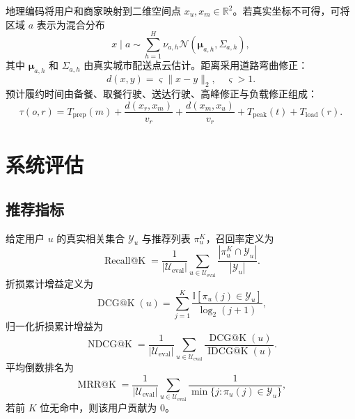 \documentclass[12pt,a4paper]{article}
\begin{document}
    地理编码将用户和商家映射到二维空间点 $x_u,x_m\in\mathbb{R}^2$。若真实坐标不可得，可将区域 $a$ 表示为混合分布
    \begin{equation}
        x\mid a\sim \sum_{h=1}^{H}\nu_{a,h}\mathcal{N}(\boldsymbol{\mu}_{a,h},\Sigma_{a,h}),
    \end{equation}
    其中 $\boldsymbol{\mu}_{a,h}$ 和 $\Sigma_{a,h}$ 由真实城市配送点云估计。距离采用道路弯曲修正：
    \begin{equation}
        d(x,y)=\varsigma\|x-y\|_2,\quad \varsigma>1.
    \end{equation}
    预计履约时间由备餐、取餐行驶、送达行驶、高峰修正与负载修正组成：
    \begin{equation}
        \tau(o,r)=T_{\mathrm{prep}}(m)+\frac{d(x_r,x_m)}{v_r}+\frac{d(x_m,x_u)}{v_r}+T_{\mathrm{peak}}(t)+T_{\mathrm{load}}(r).
    \end{equation}

    \section{系统评估}

    \subsection{推荐指标}

    给定用户 $u$ 的真实相关集合 $\mathcal{Y}_u$ 与推荐列表 $\pi_u^K$，召回率定义为
    \begin{equation}
        \operatorname{Recall@K}=\frac{1}{|\mathcal{U}_{\mathrm{eval}}|}\sum_{u\in\mathcal{U}_{\mathrm{eval}}}\frac{|\pi_u^K\cap\mathcal{Y}_u|}{|\mathcal{Y}_u|}.
    \end{equation}
    折损累计增益定义为
    \begin{equation}
        \operatorname{DCG@K}(u)=\sum_{j=1}^{K}\frac{\mathbb{I}[\pi_u(j)\in\mathcal{Y}_u]}{\log_2(j+1)},
    \end{equation}
    归一化折损累计增益为\cite{jarvelin2002ndcg}
    \begin{equation}
        \operatorname{NDCG@K}=\frac{1}{|\mathcal{U}_{\mathrm{eval}}|}\sum_{u\in\mathcal{U}_{\mathrm{eval}}}\frac{\operatorname{DCG@K}(u)}{\operatorname{IDCG@K}(u)}.
    \end{equation}
    平均倒数排名为
    \begin{equation}
        \operatorname{MRR@K}=\frac{1}{|\mathcal{U}_{\mathrm{eval}}|}\sum_{u\in\mathcal{U}_{\mathrm{eval}}}\frac{1}{\min\{j:\pi_u(j)\in\mathcal{Y}_u\}},
    \end{equation}
    若前 $K$ 位无命中，则该用户贡献为 0。
\end{document}
